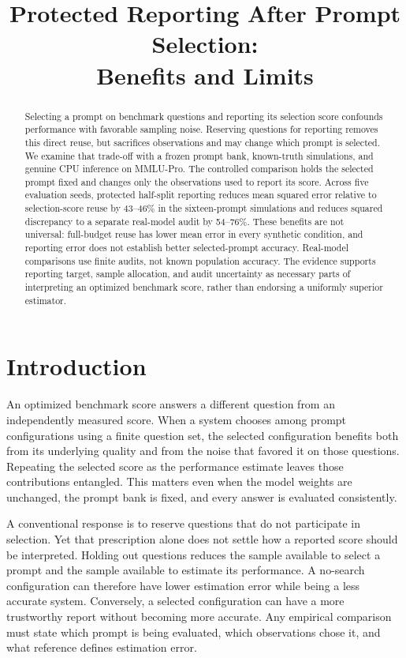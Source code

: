 \documentclass{article}
\title{Protected Reporting After Prompt Selection:\\Benefits and Limits}
\begin{document}
\maketitle

\begin{abstract}
Selecting a prompt on benchmark questions and reporting its selection score confounds performance with favorable sampling noise. Reserving questions for reporting removes this direct reuse, but sacrifices observations and may change which prompt is selected. We examine that trade-off with a frozen prompt bank, known-truth simulations, and genuine CPU inference on MMLU-Pro. The controlled comparison holds the selected prompt fixed and changes only the observations used to report its score. Across five evaluation seeds, protected half-split reporting reduces mean squared error relative to selection-score reuse by 43--46\% in the sixteen-prompt simulations and reduces squared discrepancy to a separate real-model audit by 54--76\%. These benefits are not universal: full-budget reuse has lower mean error in every synthetic condition, and reporting error does not establish better selected-prompt accuracy. Real-model comparisons use finite audits, not known population accuracy. The evidence supports reporting target, sample allocation, and audit uncertainty as necessary parts of interpreting an optimized benchmark score, rather than endorsing a uniformly superior estimator.
\end{abstract}

\section{Introduction}
An optimized benchmark score answers a different question from an independently measured score. When a system chooses among prompt configurations using a finite question set, the selected configuration benefits both from its underlying quality and from the noise that favored it on those questions. Repeating the selected score as the performance estimate leaves those contributions entangled. This matters even when the model weights are unchanged, the prompt bank is fixed, and every answer is evaluated consistently.

A conventional response is to reserve questions that do not participate in selection. Yet that prescription alone does not settle how a reported score should be interpreted. Holding out questions reduces the sample available to select a prompt and the sample available to estimate its performance. A no-search configuration can therefore have lower estimation error while being a less accurate system. Conversely, a selected configuration can have a more trustworthy report without becoming more accurate. Any empirical comparison must state which prompt is being evaluated, which observations chose it, and what reference defines estimation error.
\end{document}
